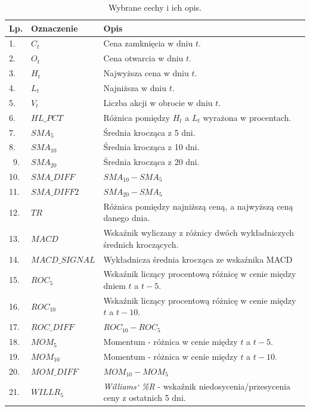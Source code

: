 \documentclass[a4paper, twoside, 11pt, openright]{article}
\begin{document}
\begin{longtable}[c]{| m{0.5cm} m{5cm} m{10cm}|} 

\toprule
  Lp. & Oznaczenie & Opis\\
\midrule
\endhead
\midrule

\caption{Wybrane cechy i ich opis}
\label{tab:data_columns_table}
\endfoot

\bottomrule
\caption{Wybrane cechy i ich opis.}
\label{tab:data_columns_table}
\endlastfoot


 1. & $C_t$ & Cena zamknięcia w dniu $t$. \\ 
 2. & $O_t$ & Cena otwarcia w dniu $t$. \\
 3. & $H_t$ & Najwyższa cena w dniu $t$. \\
 4. & $L_t$ & Najniższa w dniu $t$. \\
 5. & $V_t$ & Liczba akcji w obrocie w dniu $t$. \\
 6. & $HL\_PCT$ & Różnica pomiędzy $H_t$ a $L_t$ wyrażona w procentach.\\
 7. & $SMA_5$ & Średnia krocząca z 5 dni. \\
 8. & $SMA_{10}$ & Średnia krocząca z 10 dni. \\\
  9. & $SMA_{20}$ & Średnia krocząca z 20 dni. \\
 10. & $SMA\_DIFF$ & $SMA_{10}-SMA_{5}$ \\
 11. & $SMA\_DIFF2$ & $SMA_{20}-SMA_{5}$ \\
 12. & $TR$ & Różnica pomiędzy najniższą ceną, a najwyższą ceną danego dnia. \\
 13. & $MACD$ & Wskaźnik wyliczany z różnicy dwóch wykładniczych średnich kroczących.\\
 14. & $MACD\_SIGNAL$ & Wykładnicza średnia krocząca ze wskaźnika MACD \\
 15. & $ROC_{5}$ & Wskaźnik liczący procentową różnicę w cenie między dniem $t$ a $t-5$. \\
 16. & $ROC_{10}$ & Wskaźnik liczący procentową różnicę w cenie między $t$ a $t-10$. \\
 17. & $ROC\_DIFF$ & $ROC_{10}-ROC_{5}$ \\
  18. & $MOM_{5}$ & Momentum - różnica w cenie między $t$ a $t-5$.  \\
 19. & $MOM_{10}$ & Momentum - różnica w cenie między $t$ a $t-10$. \\
 20. & $MOM\_DIFF$ & $MOM_{10}-MOM_{5}$ \\
  21. & $WILLR_{5}$ & \textit{Williams` \%R} - wskaźnik niedosycenia/przesycenia ceny z ostatnich 5 dni. \\

\end{longtable}
\end{document}
